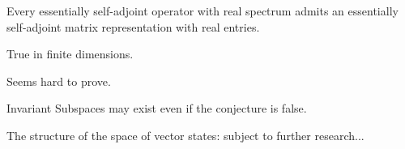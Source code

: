\begin{slide}{}
\begin{con}
Every essentially self-adjoint operator with real spectrum
admits an essentially self-adjoint matrix representation with
real entries.
\end{con}

True in finite dimensions.

Seems hard to prove.

Invariant Subspaces may exist even if the conjecture is false.

\medskip

The structure of the space of vector states: subject to further
research...
\end{slide}


